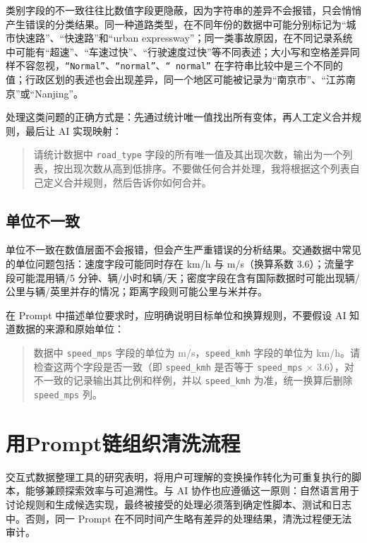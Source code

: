 类别字段的不一致往往比数值字段更隐蔽，因为字符串的差异不会报错，只会悄悄产生错误的分类结果。同一种道路类型，在不同年份的数据中可能分别标记为“城市快速路”、“快速路”和“urban expressway”；同一类事故原因，在不同记录系统中可能有“超速”、“车速过快”、“行驶速度过快”等不同表述；大小写和空格差异同样不容忽视，\texttt{“Normal”}、\texttt{“normal”}、\texttt{“ normal”} 在字符串比较中是三个不同的值；行政区划的表述也会出现差异，同一个地区可能被记录为“南京市”、“江苏南京”或“Nanjing”。

处理这类问题的正确方式是：先通过统计唯一值找出所有变体，再人工定义合并规则，最后让 AI 实现映射：

\begin{quote}
请统计数据中 \texttt{road\_type} 字段的所有唯一值及其出现次数，输出为一个列表，按出现次数从高到低排序。不要做任何合并处理，我将根据这个列表自己定义合并规则，然后告诉你如何合并。
\end{quote}

\subsection{单位不一致}

单位不一致在数值层面不会报错，但会产生严重错误的分析结果。交通数据中常见的单位问题包括：速度字段可能同时存在 km/h 与 m/s（换算系数 3.6）；流量字段可能混用辆/5 分钟、辆/小时和辆/天；密度字段在含有国际数据时可能出现辆/公里与辆/英里并存的情况；距离字段则可能公里与米并存。

在 Prompt 中描述单位要求时，应明确说明目标单位和换算规则，不要假设 AI 知道数据的来源和原始单位：

\begin{quote}
数据中 \texttt{speed\_mps} 字段的单位为 m/s，\texttt{speed\_kmh} 字段的单位为 km/h。请检查这两个字段是否一致（即 \texttt{speed\_kmh} 是否等于 \texttt{speed\_mps} $\times$ 3.6），对不一致的记录输出其比例和样例，并以 \texttt{speed\_kmh} 为准，统一换算后删除 \texttt{speed\_mps} 列。
\end{quote}

\section{用Prompt链组织清洗流程}

交互式数据整理工具的研究表明，将用户可理解的变换操作转化为可重复执行的脚本，能够兼顾探索效率与可追溯性\cite{kandel2011wrangler}。与 AI 协作也应遵循这一原则：自然语言用于讨论规则和生成候选实现，最终被接受的处理必须落到确定性脚本、测试和日志中。否则，同一 Prompt 在不同时间产生略有差异的处理结果，清洗过程便无法审计。


